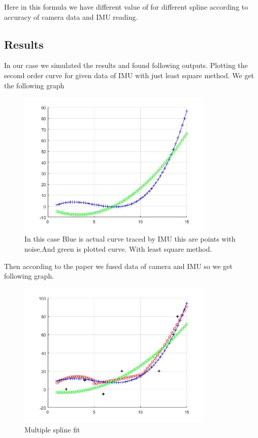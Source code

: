  Here in this formula we have different value of  for different spline according to accuracy of camera data and IMU reading.

\subsection{Results}
 
 In our case we simulated the results and found following outputs.
Plotting the second order curve for given data of IMU with just least square method. We get the following graph

\begin{figure}[!htb]
\includegraphics[width=\textwidth,height=7cm,keepaspectratio]{./figures/lsm.jpg}
\caption{In this case Blue is actual curve traced by IMU this are points with noise.And green is plotted curve. With least square method.}
\end{figure}

Then according to the paper we fused data of camera and IMU so we get following graph.

\begin{figure}[!htb]
\includegraphics[width=\textwidth,height=7cm,keepaspectratio]{./figures/AllOutput.jpg}
\caption{Multiple spline fit}
\label{fig:multipleSpline}
\end{figure}

